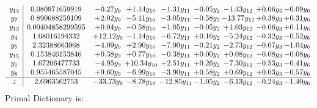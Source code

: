 \documentclass[9pt]{article}
\begin{document}
\[\begin{array}{c| c c@{\hskip 2pt} c@{\hskip 2pt} c@{\hskip 2pt} c@{\hskip 2pt} c@{\hskip 2pt} c@{\hskip 2pt} c@{\hskip 2pt} }
 y_{14}   &  0.080971659919 & -0.27 y_{9} & +  1.14 y_{10} & -1.31 y_{11} & -0.05 y_{2} & -1.43 y_{12} & +  0.06 y_{3} & -0.09 y_{6}\\
 y_{7}   &  0.890688259109 & +  2.02 y_{9} & -5.11 y_{10} & -3.05 y_{11} & -0.58 y_{2} & -13.77 y_{12} & +  0.38 y_{3} & +  0.31 y_{6}\\
 y_{13}   &  0.00404858299595 & +  0.04 y_{9} & -0.58 y_{10} & +  1.05 y_{11} & -0.05 y_{2} & +  1.03 y_{12} & -0.06 y_{3} & +  0.11 y_{6}\\
 y_{4}   &  1.68016194332 & + 12.12 y_{9} & -1.14 y_{10} & -6.72 y_{11} & +  0.16 y_{2} & -5.24 y_{12} & -0.32 y_{3} & -0.52 y_{6}\\
 y_{5}   &  2.32388663968 & -4.09 y_{9} & +  2.90 y_{10} & -7.90 y_{11} & -0.21 y_{2} & -2.73 y_{12} & -0.07 y_{3} & -1.04 y_{6}\\
 y_{15}   &  0.153846153846 & +  0.38 y_{9} & +  0.77 y_{10} & -0.38 y_{11} & +  0.00 y_{2} & +  0.08 y_{12} & -0.08 y_{3} & -0.08 y_{6}\\
 y_{1}   &  1.67206477733 & -4.95 y_{9} & + 10.34 y_{10} & +  2.51 y_{11} & +  0.26 y_{2} & -7.30 y_{12} & -0.53 y_{3} & -0.41 y_{6}\\
 y_{8}   &  0.955465587045 & +  9.60 y_{9} & -6.99 y_{10} & -3.90 y_{11} & +  0.58 y_{2} & +  0.69 y_{12} & +  0.03 y_{3} & -0.57 y_{6}\\
\hline
z    &  2.6963562753 & -33.73 y_{9} & -8.78 y_{10} & -12.85 y_{11} & -1.05 y_{2} & -6.13 y_{12} & -0.24 y_{3} & -1.40 y_{6}\\
\end{array}\]
Primal Dictionary is:
\end{document}
